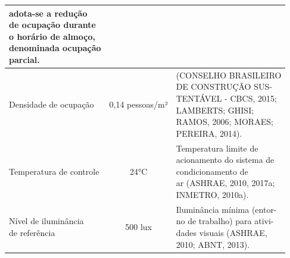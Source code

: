 \begin{table}[ht]
\begin{tabular*}{\columnwidth}{@{\extracolsep{\fill}}llll}
{                                                                                                                                                                                                                                                adota-se a redução\\ de ocupação durante\\ o 
                                                                                                                                                                                                                                                horário de almoço, \\denominada ocupação\\ parcial.}  \\ \hline
        Densidade de ocupação                             & \multicolumn{2}{c}{0,14 pessoas/m²} & \makecell[l]{(CONSELHO BRASILEIRO\\ DE CONSTRUÇÃO 
                                                                                                  SUS-\\TENTÁVEL - CBCS, 2015;\\ LAMBERTS; 
                                                                                                  GHISI;\\ RAMOS, 2006; MORAES;\\ PEREIRA, 2014).} \\ \hline
        Temperatura de controle                           & \multicolumn{2}{c}{24°C}            & \makecell[l]{Temperatura limite de\\ acionamento
                                                                                                  do sistema de\\ condicionamento de\\ ar (ASHRAE, 
                                                                                                  2010, 2017a;\\ INMETRO, 2010a).} \\ \hline
        \makecell[l]{Nível de iluminância\\ de referência}& \multicolumn{2}{c}{500 lux}         & \makecell[l]{Iluminância mínima (entor-\\no de 
                                                                                                  trabalho) para ativi-\\dades visuais 
                                                                                                  (ASHRAE,\\ 2010; ABNT, 2013).} \\ \hline

\end{tabular*}
\end{table}
